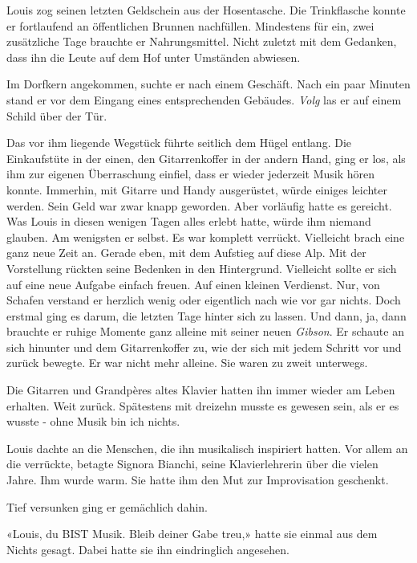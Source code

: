 \sectionbreak

Louis zog seinen letzten Geldschein aus der Hosentasche. Die Trinkflasche konnte er fortlaufend an öffentlichen Brunnen
nachfüllen. Mindestens für ein, zwei zusätzliche Tage brauchte er
Nahrungsmittel. Nicht zuletzt mit dem Gedanken, dass ihn die Leute auf
dem Hof unter Umständen abwiesen.

Im Dorfkern angekommen, suchte er nach einem Geschäft. Nach ein paar Minuten
stand er vor dem Eingang eines entsprechenden Gebäudes. \emph{Volg}
las er auf einem Schild über der Tür.

\sectionbreak

Das vor ihm liegende Wegstück führte seitlich dem Hügel entlang. 
Die Einkaufstüte in der einen, den Gitarrenkoffer in der andern Hand, ging er los, als ihm zur eigenen 
Überraschung einfiel, dass er wieder jederzeit Musik hören konnte.
Immerhin, mit Gitarre und Handy ausgerüstet, würde einiges leichter werden. Sein
Geld war zwar knapp geworden. Aber vorläufig hatte es gereicht.
Was Louis in diesen wenigen Tagen alles erlebt hatte, würde ihm niemand
glauben. Am wenigsten er selbst. Es war komplett verrückt. Vielleicht
brach eine ganz neue Zeit an. Gerade eben, mit dem Aufstieg auf diese
Alp. Mit der Vorstellung rückten seine Bedenken in den Hintergrund.
Vielleicht sollte er sich auf eine neue Aufgabe einfach freuen. Auf einen
kleinen Verdienst. Nur, von Schafen verstand er herzlich wenig oder eigentlich nach wie vor gar nichts. Doch erstmal ging es darum, die letzten Tage hinter sich zu lassen. Und dann, ja, dann brauchte er ruhige Momente ganz alleine mit seiner neuen
\emph{Gibson}. Er schaute an sich hinunter und dem Gitarrenkoffer zu, wie der sich mit jedem Schritt vor und zurück bewegte. Er war nicht mehr alleine. Sie waren zu zweit unterwegs.

\sectionbreak

Die Gitarren und Grandpères altes Klavier hatten ihn immer wieder am
Leben erhalten. Weit zurück. Spätestens mit dreizehn musste es gewesen
sein, als er es wusste - ohne Musik bin ich nichts.

Louis dachte an die Menschen, die ihn musikalisch inspiriert hatten. Vor
allem an die verrückte, betagte Signora Bianchi, seine Klavierlehrerin
über die vielen Jahre. Ihm wurde warm. Sie hatte ihm den Mut
zur Improvisation geschenkt.

Tief versunken ging er gemächlich dahin.

«Louis, du BIST Musik. Bleib deiner Gabe treu,» hatte sie einmal aus dem
Nichts gesagt. Dabei hatte sie ihn eindringlich angesehen.

